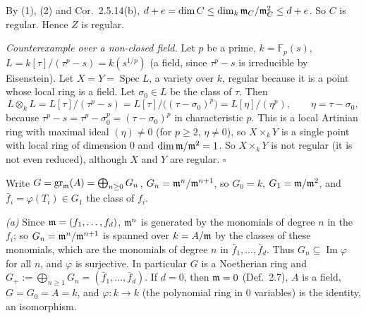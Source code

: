 \documentclass[11pt]{article}
\begin{document}
By (1), (2) and Cor.~2.5.14(b), $d+e=\dim C\le\dim_k\mathfrak m_C/\mathfrak m_C^2\le d+e$. So $C$ is regular. Hence $Z$ is regular.

\emph{Counterexample over a non-closed field.} Let $p$ be a prime, $k=\mathbb F_p(s)$, $L=k[\tau]/(\tau^p-s)=k(s^{1/p})$ (a field, since $\tau^p-s$ is irreducible by Eisenstein). Let $X=Y=\operatorname{Spec}L$, a variety over $k$, regular because it is a point whose local ring is a field. Let $\sigma_0\in L$ be the class of $\tau$. Then
\[ L\otimes_kL=L[\tau]/(\tau^p-s)=L[\tau]/\bigl((\tau-\sigma_0)^p\bigr)=L[\eta]/(\eta^p),\qquad\eta=\tau-\sigma_0, \]
because $\tau^p-s=\tau^p-\sigma_0^p=(\tau-\sigma_0)^p$ in characteristic $p$. This is a local Artinian ring with maximal ideal $(\eta)\ne0$ (for $p\ge2$, $\eta\neq 0$), so $X\times_kY$ is a single point with local ring of dimension $0$ and $\dim\mathfrak m/\mathfrak m^2=1$. So $X\times_kY$ is not regular (it is not even reduced), although $X$ and $Y$ are regular. \hfill$\square$

\pf
Write $G=\operatorname{gr}_\mathfrak m(A)=\bigoplus_{n\ge0}G_n$, $G_n=\mathfrak m^n/\mathfrak m^{n+1}$, so $G_0=k$, $G_1=\mathfrak m/\mathfrak m^2$, and $\bar f_i=\varphi(T_i)\in G_1$ the class of $f_i$.

\emph{(a)} Since $\mathfrak m=(f_1,\dots,f_d)$, $\mathfrak m^n$ is generated by the monomials of degree $n$ in the $f_i$; so $G_n=\mathfrak m^n/\mathfrak m^{n+1}$ is spanned over $k=A/\mathfrak m$ by the classes of these monomials, which are the monomials of degree $n$ in $\bar f_1,\dots,\bar f_d$. Thus $G_n\subseteq\operatorname{Im}\varphi$ for all $n$, and $\varphi$ is surjective. In particular $G$ is a Noetherian ring and $G_+:=\bigoplus_{n\ge1}G_n=(\bar f_1,\dots,\bar f_d)$. If $d=0$, then $\mathfrak m=0$ (Def.~2.7), $A$ is a field, $G=G_0=A=k$, and $\varphi:k\to k$ (the polynomial ring in $0$ variables) is the identity, an isomorphism.
\end{document}
